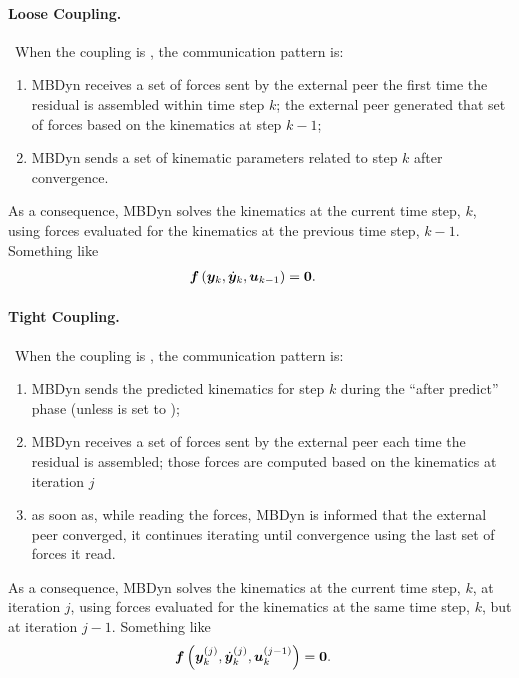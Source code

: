 \paragraph{Loose Coupling.} \
When the coupling is , the communication pattern is:
\begin{enumerate}
\item MBDyn receives a set of forces sent by the external peer
	the first time the residual is assembled within time step $k$;
	the external peer generated that set of forces
	based on the kinematics at step $k-1$;

\item MBDyn sends a set of kinematic parameters related to step $k$
	after convergence.
\end{enumerate}
As a consequence, MBDyn solves the kinematics at the current time step, $k$,
using forces evaluated for the kinematics at the previous time step, $k-1$.
Something like
\begin{align}
	\boldsymbol{f}\left( \boldsymbol{y}_k, \dot{\boldsymbol{y}}_k, \boldsymbol{u}_{k - 1} \right)
	&=
	\boldsymbol{0}
	.
\end{align}

\paragraph{Tight Coupling.} \
When the coupling is , the communication pattern is:
\begin{enumerate}
\item MBDyn sends the predicted kinematics for step $k$
	during the ``after predict'' phase
	(unless \kw{send after predict} is set to \kw{no});

\item MBDyn receives a set of forces sent by the external peer
	each time the residual is assembled; those forces are computed
	based on the kinematics at iteration $j$

\item as soon as, while reading the forces, MBDyn is informed that
	the external peer converged, it continues iterating until
	convergence using the last set of forces it read.

\end{enumerate}
As a consequence, MBDyn solves the kinematics at the current time step, $k$,
at iteration $j$,
using forces evaluated for the kinematics at the same time step, $k$,
but at iteration $j-1$.
Something like
\begin{align}
	\boldsymbol{f}\left( \boldsymbol{y}_k^{(j)}, \dot{\boldsymbol{y}}_k^{(j)}, \boldsymbol{u}_k^{(j-1)} \right)
	&=
	\boldsymbol{0}
	.
\end{align}




